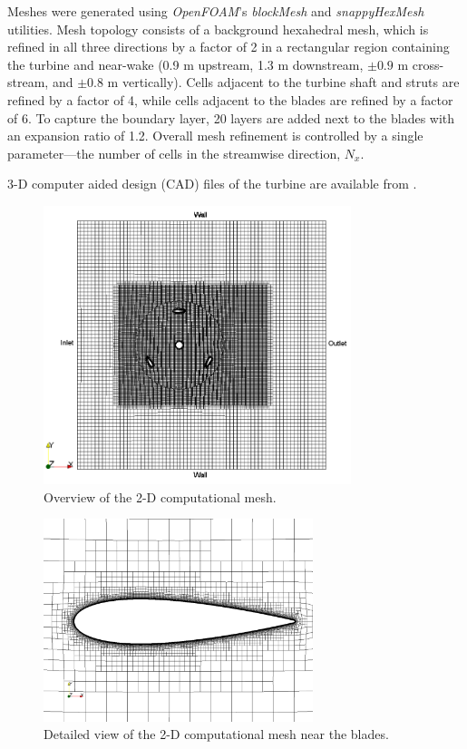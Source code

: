 \documentclass[aip,graphicx]{revtex4-1}
\begin{document}
Meshes were generated using \textit{OpenFOAM}'s \textit{blockMesh} and
\textit{snappyHexMesh} utilities. Mesh topology consists of a background
hexahedral mesh, which is refined in all three directions by a factor of 2 in a
rectangular region containing the turbine and near-wake (0.9 m upstream, 1.3 m
downstream, $\pm 0.9$ m cross-stream, and $\pm 0.8$ m vertically). Cells
adjacent to the turbine shaft and struts are refined by a factor of 4, while
cells adjacent to the blades are refined by a factor of 6. To capture the
boundary layer, 20 layers are added next to the blades with an expansion ratio
of 1.2. Overall mesh refinement is controlled by a single parameter---the number
of cells in the streamwise direction, $N_x$.

3-D computer aided design (CAD) files of the turbine are available from
\cite{Bachant2014-RVAT-CAD}.

\begin{figure}[ht]    
    \includegraphics[width=0.8\textwidth]{figures/2d_mesh}
    
    \caption{Overview of the 2-D computational mesh.}
    
    \label{fig:mesh}
\end{figure}


\begin{figure}[ht]
    \includegraphics[width=0.7\textwidth]{figures/2D_blade_mesh_closeup}
    
    \caption{Detailed view of the 2-D computational mesh near the blades.}
    
    \label{fig:blade-mesh}
\end{figure}
\end{document}
